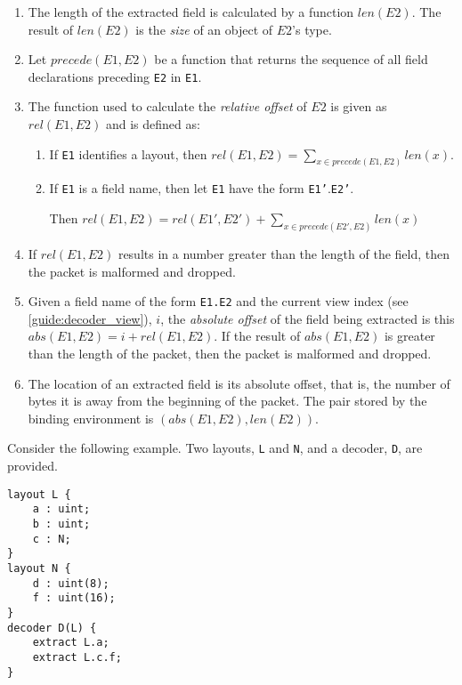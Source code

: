\begin{enumerate}
\item The length of the extracted field is calculated by a function $len(E2)$. The result of $len(E2)$ is the \textit{size} of an object of $E2$'s type.

\item  Let $precede(E1, E2)$ be a function that returns the sequence of all field declarations preceding \texttt{E2} in \texttt{E1}. 

\item The function used to calculate the \textit{relative offset} of $E2$ is given as $rel(E1, E2)$ and is defined as:

\begin{enumerate}

\item If \texttt{E1} identifies a layout, then $rel(E1, E2) = \sum_{x \in precede(E1,E2)}{} len(x)$.

\item If \texttt{E1} is a field name, then let \texttt{E1} have the form \texttt{E1'}.\texttt{E2'}.

Then $rel(E1, E2)=rel(E1', E2') + \sum_{x \in precede(E2',E2)}{} len(x)$

\end{enumerate}

\item If $rel(E1, E2)$ results in a number greater than the length of the field, then the packet is malformed and dropped.

\item Given a field name of the form \texttt{E1.E2} and the current view index (see \ref{guide:decoder_view}), $i$, the \textit{absolute offset} of the field being extracted is this $abs(E1, E2) = i + rel(E1, E2)$.
If the result of $abs(E1, E2)$ is greater than the length of the packet, then the packet is malformed and dropped.

\item The location of an extracted field is its absolute offset, that is, the number of bytes it is away from the beginning of the packet. The pair stored by the binding environment is $(abs(E1, E2), len(E2))$.

\end{enumerate}

Consider the following example. Two layouts, \texttt{L} and \texttt{N}, and a decoder, \texttt{D}, are provided.

\begin{minip}
\begin{lstlisting}
layout L {
	a : uint;
	b : uint;
	c : N;
}
layout N {
	d : uint(8);
	f : uint(16);
}
decoder D(L) {
	extract L.a;
	extract L.c.f;
}
\end{lstlisting}
\end{minip}

